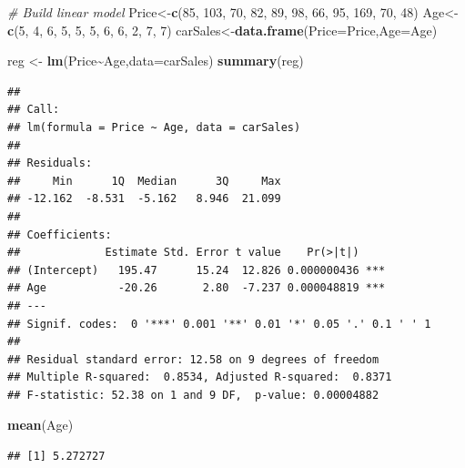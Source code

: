 \documentclass[
]{article}
\newenvironment{Shaded}{\begin{snugshade}}{\end{snugshade}}
\newcommand{\AttributeTok}[1]{\textcolor[rgb]{0.13,0.29,0.53}{#1}}
\newcommand{\CommentTok}[1]{\textcolor[rgb]{0.56,0.35,0.01}{\textit{#1}}}
\newcommand{\DecValTok}[1]{\textcolor[rgb]{0.00,0.00,0.81}{#1}}
\newcommand{\FunctionTok}[1]{\textcolor[rgb]{0.13,0.29,0.53}{\textbf{#1}}}
\newcommand{\NormalTok}[1]{#1}
\newcommand{\OtherTok}[1]{\textcolor[rgb]{0.56,0.35,0.01}{#1}}
\newcommand{\SpecialCharTok}[1]{\textcolor[rgb]{0.81,0.36,0.00}{\textbf{#1}}}
\begin{document}
\begin{Shaded}
\begin{Highlighting}[]
\CommentTok{\# Build linear model }
\NormalTok{Price}\OtherTok{\textless{}{-}}\FunctionTok{c}\NormalTok{(}\DecValTok{85}\NormalTok{, }\DecValTok{103}\NormalTok{,  }\DecValTok{70}\NormalTok{,  }\DecValTok{82}\NormalTok{,  }\DecValTok{89}\NormalTok{,  }\DecValTok{98}\NormalTok{,  }\DecValTok{66}\NormalTok{,  }\DecValTok{95}\NormalTok{, }\DecValTok{169}\NormalTok{,  }\DecValTok{70}\NormalTok{,  }\DecValTok{48}\NormalTok{)}
\NormalTok{Age}\OtherTok{\textless{}{-}} \FunctionTok{c}\NormalTok{(}\DecValTok{5}\NormalTok{, }\DecValTok{4}\NormalTok{, }\DecValTok{6}\NormalTok{, }\DecValTok{5}\NormalTok{, }\DecValTok{5}\NormalTok{, }\DecValTok{5}\NormalTok{, }\DecValTok{6}\NormalTok{, }\DecValTok{6}\NormalTok{, }\DecValTok{2}\NormalTok{, }\DecValTok{7}\NormalTok{, }\DecValTok{7}\NormalTok{)}
\NormalTok{carSales}\OtherTok{\textless{}{-}}\FunctionTok{data.frame}\NormalTok{(}\AttributeTok{Price=}\NormalTok{Price,}\AttributeTok{Age=}\NormalTok{Age)}

\NormalTok{reg }\OtherTok{\textless{}{-}} \FunctionTok{lm}\NormalTok{(Price}\SpecialCharTok{\textasciitilde{}}\NormalTok{Age,}\AttributeTok{data=}\NormalTok{carSales)}
\FunctionTok{summary}\NormalTok{(reg)}
\end{Highlighting}
\end{Shaded}

\begin{verbatim}
## 
## Call:
## lm(formula = Price ~ Age, data = carSales)
## 
## Residuals:
##     Min      1Q  Median      3Q     Max 
## -12.162  -8.531  -5.162   8.946  21.099 
## 
## Coefficients:
##             Estimate Std. Error t value    Pr(>|t|)    
## (Intercept)   195.47      15.24  12.826 0.000000436 ***
## Age           -20.26       2.80  -7.237 0.000048819 ***
## ---
## Signif. codes:  0 '***' 0.001 '**' 0.01 '*' 0.05 '.' 0.1 ' ' 1
## 
## Residual standard error: 12.58 on 9 degrees of freedom
## Multiple R-squared:  0.8534, Adjusted R-squared:  0.8371 
## F-statistic: 52.38 on 1 and 9 DF,  p-value: 0.00004882
\end{verbatim}

\begin{Shaded}
\begin{Highlighting}[]
\FunctionTok{mean}\NormalTok{(Age)}
\end{Highlighting}
\end{Shaded}

\begin{verbatim}
## [1] 5.272727
\end{verbatim}
\end{document}
